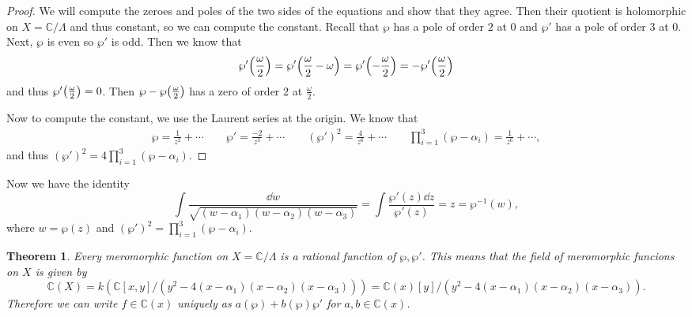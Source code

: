 \documentclass[leqno, openany]{memoir}
\newtheorem{thm}{Theorem}[section]
\theoremstyle{definition}
\theoremstyle{remark}
\theoremstyle{plain}
\theoremstyle{definition}
\theoremstyle{remark}
\newcommand{\C}{\mathbb{C}}
\begin{document}
\begin{proof}
    We will compute the zeroes and poles of the two sides of the equations and show that they agree. Then their quotient is holomorphic on $X = \C /\Lambda$ and thus constant, so we can compute the constant. Recall that $\wp$ has a pole of order $2$ at $0$ and $\wp'$ has a pole of order $3$ at $0$. Next, $\wp$ is even so $\wp'$ is odd. Then we know that 
    \[ \wp'\qty(\frac{\omega}{2}) = \wp'\qty(\frac{\omega}{2} - \omega) = \wp'\qty(-\frac{\omega}{2}) = -\wp'\qty(\frac{\omega}{2}) \]
    and thus $\wp'\qty(\frac{\omega}{2}) = 0$. Then $\wp - \wp\qty(\frac{\omega}{2})$ has a zero of order $2$ at $\frac{\omega}{2}$.

    Now to compute the constant, we use the Laurent series at the origin. We know that
    \begin{align*}
        \wp = \frac{1}{z^2} + \cdots \qquad \wp' = \frac{-2}{z^3} + \cdots \qquad {(\wp')}^2 = \frac{4}{z^6} + \cdots \qquad \prod_{i=1}^3(\wp - \alpha_i) = \frac{1}{z^6} + \cdots,
    \end{align*}
    and thus ${(\wp')}^2 = 4 \prod_{i=1}^3 (\wp - \alpha_i)$.
\end{proof}

Now we have the identity
\[ \int \frac{\dd{w}}{\sqrt{(w-\alpha_1)(w-\alpha_2)(w-\alpha_3)}} = \int \frac{\wp'(z) \dd{z}}{\wp'(z)} = z = \wp^{-1}(w), \]
where $w = \wp(z)$ and ${(\wp')}^2 = \prod_{i=1}^3 (\wp - \alpha_i)$.

\begin{thm}
    Every meromorphic function on $X = \C / \Lambda$ is a rational function of $\wp, \wp'$. This means that the field of meromorphic funcions on $X$ is given by
    \[ \C(X) = k(\C[x,y]/(y^2 - 4(x-\alpha_1)(x-\alpha_2)(x-\alpha_3))) = \C(x)[y]/(y^2 - 4(x-\alpha_1)(x-\alpha_2)(x-\alpha_3)). \]
    Therefore we can write $f \in \C(x)$ uniquely as $a(\wp) + b(\wp) \wp'$ for $a,b \in \C(x)$.
\end{thm}
\end{document}

